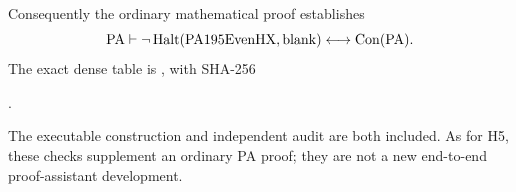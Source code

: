 Consequently the ordinary mathematical proof establishes
\[
 \mathrm{PA}\vdash
 \neg\operatorname{Halt}(\mathrm{PA195EvenHX},\mathrm{blank})
 \longleftrightarrow\operatorname{Con}(\mathrm{PA}).
\]
The exact dense table is
, with SHA-256
\begin{center}\small
{}.
\end{center}
The executable construction and independent audit are both included.
As for H5, these checks supplement an ordinary PA proof; they are not a
new end-to-end proof-assistant development.
